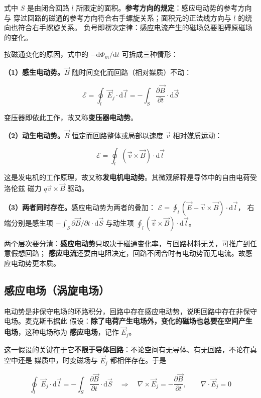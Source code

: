 式中 $S$ 是由闭合回路 $l$ 所限定的面积。\textbf{参考方向的规定}：感应电动势的参考方向与
穿过回路的磁通的参考方向符合右手螺旋关系；面积元的正法线方向与 $l$ 的绕向也符合右手螺旋关系。
负号即楞次定律：感应电流产生的磁场总要阻碍原磁场的变化。

按磁通变化的原因，式中的 $-{\mathrm{d}\Phi_m}/{\mathrm{d}t}$ 可拆成三种情形：

\textbf{（1）感生电动势。}$\vec{B}$ 随时间变化而回路（相对媒质）不动：
\begin{formulaBox}
\[
\mathcal{E}=\oint_{l}\vec{E}_j\cdot \mathrm{d}\vec{l}
=-\int_{S}\frac{\partial \vec{B}}{\partial t}\cdot \mathrm{d}\vec{S}
\]
\end{formulaBox}
变压器即依此工作，故又称\textbf{变压器电动势}。

\textbf{（2）动生电动势。}$\vec{B}$ 恒定而回路整体或局部以速度 $\vec{v}$ 相对媒质运动：
\begin{formulaBox}
\[
\mathcal{E}=\oint_{l}(\vec{v}\times \vec{B})\cdot \mathrm{d}\vec{l}
\]
\end{formulaBox}
这是发电机的工作原理，故又称\textbf{发电机电动势}。其微观解释是导体中的自由电荷受洛伦兹
磁力 $q\vec{v}\times\vec{B}$ 驱动。

\textbf{（3）两者同时存在。}感应电动势为两者的叠加：
$\mathcal{E}=\oint_{l}(\vec{E}+\vec{v}\times\vec{B})\cdot \mathrm{d}\vec{l}$，
右端分别是感生项 $-\int_S\partial\vec{B}/\partial t\cdot \mathrm{d}\vec{S}$ 与动生项
$\oint_l(\vec{v}\times\vec{B})\cdot \mathrm{d}\vec{l}$。

两个层次要分清：\textbf{感应电动势}只取决于磁通变化率，与回路材料无关，可推广到任意假想回路；
\textbf{感应电流}还要由电阻决定，回路不闭合时有电动势而无电流。故感应电动势更本质。

\subsection{感应电场（涡旋电场）}

电动势是非保守电场的环路积分，回路中存在感应电动势，说明回路中存在非保守电场。麦克斯韦据此
假设：\textbf{除了电荷产生电场外，变化的磁场也总要在空间产生电场}，这种电场称为
\textbf{感应电场}，记作 $\vec{E}_j$。

这一假设的关键在于它\textbf{不限于导体回路}：不论空间有无导体、有无回路，不论在真空中还是
媒质中，时变磁场与 $\vec{E}_j$ 都相伴存在。于是

\begin{formulaBox}
\[
\oint_{l}\vec{E}_j\cdot \mathrm{d}\vec{l}
=-\int_{S}\frac{\partial \vec{B}}{\partial t}\cdot \mathrm{d}\vec{S}
\quad\Longrightarrow\quad
\nabla\times \vec{E}_j=-\frac{\partial \vec{B}}{\partial t},
\qquad \nabla\cdot \vec{E}_j=0
\]
\end{formulaBox}

